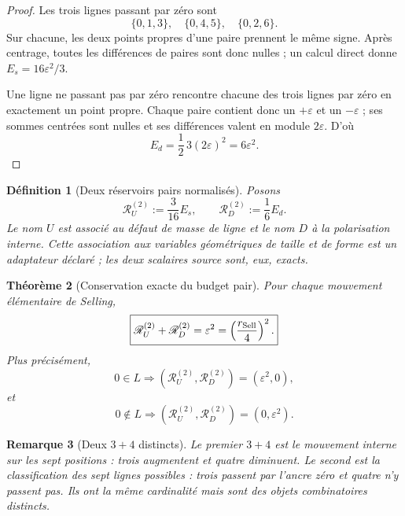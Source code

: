 \documentclass[11pt,a4paper]{article}
\newtheorem{theorem}{Théorème}[section]
\newtheorem{definition}[theorem]{Définition}
\newtheorem{remark}[theorem]{Remarque}
\begin{document}
\begin{proof}
Les trois lignes passant par zéro sont
\[
 \{0,1,3\},\quad\{0,4,5\},\quad\{0,2,6\}.
\]
Sur chacune, les deux points propres d'une paire prennent le même signe. Après centrage, toutes les différences de paires sont donc nulles ; un calcul direct donne $E_s=16\varepsilon^2/3$.

Une ligne ne passant pas par zéro rencontre chacune des trois lignes par zéro en exactement un point propre. Chaque paire contient donc un $+\varepsilon$ et un $-\varepsilon$ ; ses sommes centrées sont nulles et ses différences valent en module $2\varepsilon$. D'où
\[
 E_d=\frac12\,3(2\varepsilon)^2=6\varepsilon^2.
\]
\end{proof}

\begin{definition}[Deux réservoirs pairs normalisés]\label{def:v12-even-reservoirs}
Posons
\begin{equation}\label{eq:v12-even-reservoirs}
 \boxed{
 \mathscr R_U^{(2)}
 :=\frac3{16}E_s,\qquad
 \mathscr R_D^{(2)}
 :=\frac16E_d.}
\end{equation}
Le nom $U$ est associé au défaut de masse de ligne et le nom $D$ à la polarisation interne. Cette association aux variables géométriques de taille et de forme est un adaptateur déclaré ; les deux scalaires source sont, eux, exacts.
\end{definition}

\begin{theorem}[Conservation exacte du budget pair]\label{thm:v12-even-conservation}
Pour chaque mouvement élémentaire de Selling,
\begin{equation}\label{eq:v12-even-conservation}
 \boxed{
 \mathscr R_U^{(2)}
 +
 \mathscr R_D^{(2)}
 =
 \varepsilon^2
 =
 \left(\frac{r_{\rm Sell}}4\right)^2.}
\end{equation}
Plus précisément,
\[
 0\in L
 \Longrightarrow
 (\mathscr R_U^{(2)},\mathscr R_D^{(2)})
 =(\varepsilon^2,0),
\]
et
\[
 0\notin L
 \Longrightarrow
 (\mathscr R_U^{(2)},\mathscr R_D^{(2)})
 =(0,\varepsilon^2).
\]
\end{theorem}

\begin{remark}[Deux $3+4$ distincts]
Le premier $3+4$ est le mouvement interne sur les sept positions : trois augmentent et quatre diminuent. Le second est la classification des \emph{sept lignes possibles} : trois passent par l'ancre zéro et quatre n'y passent pas. Ils ont la même cardinalité mais sont des objets combinatoires distincts.
\end{remark}
\end{document}
